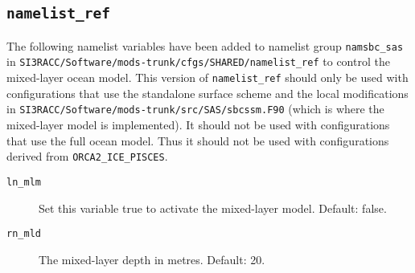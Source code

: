 \subsection{\texorpdfstring{\texttt{namelist\_ref}}{namelist ref}}
\label{sec:topo-nml:subsec:ref}

The following namelist variables have been added to namelist group \verb|namsbc_sas| in \verb|SI3RACC/Software/mods-trunk/cfgs/SHARED/namelist_ref| to control the mixed-layer ocean model.
This version of \verb|namelist_ref| should only be used with configurations that use the standalone surface scheme and the local modifications in \verb|SI3RACC/Software/mods-trunk/src/SAS/sbcssm.F90| (which is where the mixed-layer model is implemented).
It should not be used with configurations that use the full ocean model.
Thus it should not be used with configurations derived from \verb|ORCA2_ICE_PISCES|.

\begin{description}

    \item[\texttt{ln\_mlm}]
        Set this variable true to activate the mixed-layer model.
        Default: false.

    \item[\texttt{rn\_mld}]
        The mixed-layer depth in metres.
        Default: 20.

\end{description}
